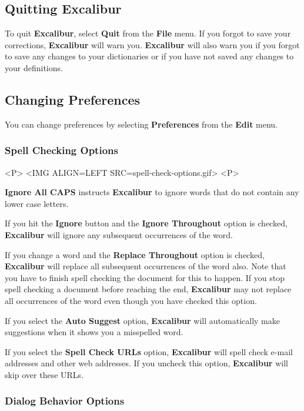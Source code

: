 \documentclass[11pt,titlepage]{article}
\newcommand{\ex}{\textbf{Excalibur}}
\begin{document}
\subsection{Quitting Excalibur}

To quit \ex, select \textbf{Quit} from the \textbf{File} menu. If you
forgot to save your corrections, \ex{} will warn you. \ex{} will also
warn you if you forgot to save any changes to your dictionaries or if
you have not saved any changes to your definitions.

\subsection{Changing Preferences}

You can change preferences by selecting \textbf{Preferences} from the
\textbf{Edit} menu.

\subsubsection{Spell Checking Options}
\label{sec:spell-check-options}

\begin{rawhtml}
<P>
<IMG ALIGN=LEFT SRC=spell-check-options.gif>
<P>
\end{rawhtml}

\textbf{Ignore All CAPS} instructs \ex{} to ignore words that do not
contain any lower case letters.

If you hit the \textbf{Ignore} button and the \textbf{Ignore
  Throughout} option is checked, \ex{} will ignore any subsequent
occurrences of the word.

If you change a word and the \textbf{Replace Throughout} option is
checked, \ex{} will replace all subsequent occurrences of the word
also.  Note that you have to finish spell checking the document for
this to happen.  If you stop spell checking a document before reaching
the end, \ex{} may not replace all occurrences of the word even though
you have checked this option.

If you select the \textbf{Auto Suggest} option, \ex{} will
automatically make suggestions when it shows you a misspelled word.

If you select the \textbf{Spell Check URLs} option, \ex{} will spell
check e-mail addresses and other web addresses.  If you uncheck this
option, \ex{} will skip over these URLs.

\subsubsection{Dialog Behavior Options}
\end{document}
